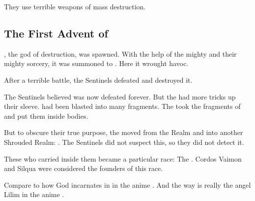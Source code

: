 They use terrible weapons of mass destruction. 










\subsection{The First Advent of \Lithrim}
, the \bane god of destruction, was spawned.
With the help of the mighty \Cuezcans and their mighty sorcery, it was summoned to \Miith.
Here it wrought havoc. 

After a terrible battle, the Sentinels defeated \Lithrim and destroyed it. 

The Sentinels believed \Lithrim was now defeated forever. 
But the \banes had more tricks up their sleeve.
\Lithrim had been blasted into many fragments. 
The \banes took the fragments of \Lithrim and put them inside \human bodies. 

But to obscure their true purpose, the \banes moved \Lithrim from the \Cuezcan Realm and into another Shrouded Realm: 
\Azmith.
The Sentinels did not suspect this, so they did not detect it. 

These \humans who carried \Lithrim inside them became a particular \demihuman race:
The . 
Cordos Vaimon and Silqua were considered the founders of this race. 

Compare to how God incarnates in \humanity in the anime \cite{Anime:MaoDante}. 
And the way \humanity is really the angel Lilim in the anime \cite{Anime:NeonGenesisEvangelion}. 









